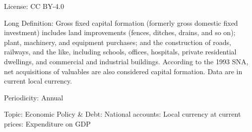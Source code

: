 \documentclass[a4paper]{article}
\begin{document}
License:  CC BY-4.0 

Long Definition: Gross fixed capital formation (formerly gross domestic fixed investment) includes land improvements (fences, ditches, drains, and so on); plant, machinery, and equipment purchases; and the construction of roads, railways, and the like, including schools, offices, hospitals, private residential dwellings, and commercial and industrial buildings. According to the 1993 SNA, net acquisitions of valuables are also considered capital formation. Data are in current local currency.

Periodicity: Annual

Topic: Economic Policy \& Debt: National accounts: Local currency at current prices: Expenditure on GDP
\end{document}
